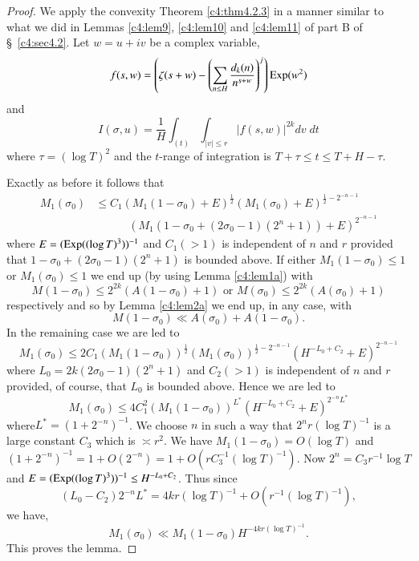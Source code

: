 \begin{proof}
We apply the convexity Theorem \ref{c4:thm4.2.3} in a manner similar to what we did in Lemmas \ref{c4:lem9}, \ref{c4:lem10} and \ref{c4:lem11} of part B of \S\ \ref{c4:sec4.2}. Let $w = u + iv$ be a complex variable,
$$
f(s,w) = \left(\zeta (s+w) - \left(\sum\limits_{n\leq H} \frac{d_k (n)}{n^{s+w}}\right)^j \right) \operatorname{Exp} (w^2)
$$
and
$$
I(\sigma , u) =\frac{1}{H} \int_{(t)} \int_{|v| \leq r} |f(s,w)|^{2k} dv \; dt
$$
where $\tau = (\log T)^2$ and the $t$-range of integration is $T + \tau \leq t \leq T + H-\tau $.

Exactly as before it follows that
\begin{align*}
M_1(\sigma_0) &\leq C_1 (M_1 (1-\sigma_0) + E)^{\frac{1}{2}} (M_1
(\sigma_0 ) + E)^{\frac{1}{2}- 2^{-n-1}}\\ 
&\qquad\quad (M_1 (1-\sigma_0 + (2\sigma_0 -1) (2^n + 1)) + E)^{2^{-n-1}}  
\end{align*}
where $E = (\operatorname{Exp} ((\log T)^3))^{-1}$ and $C_1(>1)$ is independent of $n$ and $r$ provided that $1-\sigma_0 + (2\sigma_0 -1) (2^n+1)$ is bounded above. If either $M_1 (1-\sigma_0) \leq 1$ or $M_1 (\sigma_0) \leq 1$ we end up (by using Lemma \ref{c4:lem1a}) with
$$
M(1-\sigma_0) \leq 2^{2k} (A (1-\sigma_0) + 1) \text{ or } M (\sigma_0) \leq 2^{2k} (A(\sigma_0) +1)
$$
respectively and so by Lemma \ref{c4:lem2a} we end up, in any case, with
$$
M(1-\sigma_0) \ll A (\sigma_0) + A(1-\sigma_0).
$$
In the remaining case we are led to
$$
M_1 (\sigma_0) \leq 2 C_1 (M_1 (1-\sigma_0))^{\frac{1}{2}} (M_1 (\sigma_0))^{\frac{1}{2} - 2^{-n-1}} (H^{-L_0 + C_2} + E)^{2^{-n-1}}
$$
where $L_0 = 2k (2 \sigma_0 - 1) (2^n+1)$ and $C_2 (>1)$ is independent of $n$ and $r$ provided, of course, that $L_0$ is bounded above. Hence we are led to
$$
M_1(\sigma_0) \leq 4 C^2_1 (M_1 (1-\sigma_0))^{L^*} (H^{-L_0 + C_2} + E )^{2^{-n}L^*} 
$$
where\pageoriginale $L^* = (1+2^{-n})^{-1}$. We choose $n$ in such a way that $2^n r (\log T)^{-1}$ is a large constant $C_3$ which is $\asymp r^2$. We have $M_1 (1-\sigma_0) = O(\log T)$ and $(1+ 2^{-n})^{-1} = 1 + O(2^{-n}) = 1 + O(r C^{-1}_3 (\log T)^{-1})$. Now $2^n = C_3 r^{-1} \log T$ and $E = (\operatorname{Exp} ((\log T)^3))^{-1} \leq H^{-L_0 + C_2}$. Thus since
$$
(L_0 - C_2)2^{-n} L^* = 4 kr (\log T)^{-1} + O(r^{-1} (\log T)^{-1}),
$$
we have,
$$
M_1(\sigma_0) \ll M_1(1-\sigma_0) H^{-4 kr (\log T)^{-1}}. 
$$
This proves the lemma.
\end{proof}

